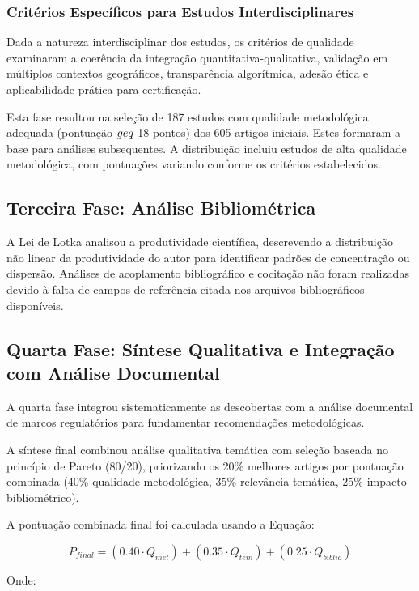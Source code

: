 \subsubsection{Critérios Específicos para Estudos Interdisciplinares}

Dada a natureza interdisciplinar dos estudos, os critérios de qualidade examinaram a coerência da integração quantitativa-qualitativa, validação em múltiplos contextos geográficos, transparência algorítmica, adesão ética e aplicabilidade prática para certificação.

Esta fase resultou na seleção de 187 estudos com qualidade metodológica adequada (pontuação $\\geq$ 18 pontos) dos 605 artigos iniciais. Estes formaram a base para análises subsequentes. A distribuição incluiu estudos de alta qualidade metodológica, com pontuações variando conforme os critérios estabelecidos.

\subsection{Terceira Fase: Análise Bibliométrica}

A Lei de Lotka analisou a produtividade científica, descrevendo a distribuição não linear da produtividade do autor para identificar padrões de concentração ou dispersão. Análises de acoplamento bibliográfico e cocitação não foram realizadas devido à falta de campos de referência citada nos arquivos bibliográficos disponíveis.

\subsection{Quarta Fase: Síntese Qualitativa e Integração com Análise Documental}

A quarta fase integrou sistematicamente as descobertas com a análise documental de marcos regulatórios para fundamentar recomendações metodológicas.

A síntese final combinou análise qualitativa temática com seleção baseada no princípio de Pareto (80/20), priorizando os 20\% melhores artigos por pontuação combinada (40\% qualidade metodológica, 35\% relevância temática, 25\% impacto bibliométrico).

A pontuação combinada final foi calculada usando a Equação:

\[
P_{final} = (0.40 \cdot Q_{met}) + (0.35 \cdot Q_{tem}) + (0.25 \cdot Q_{biblio})
\]

Onde:

